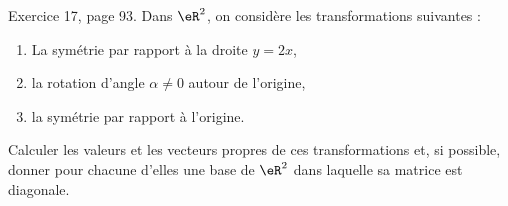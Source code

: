 \begin{exercice}\label{exoLineraire0040}

	Exercice 17, page 93. Dans $\eR^2$, on considère les transformations suivantes :
	\begin{enumerate}

		\item
			La symétrie par rapport à la droite $y=2x$,
		\item
			la rotation d'angle $\alpha\neq 0$ autour de l'origine,
		\item
			la symétrie par rapport à l'origine.
	\end{enumerate}
	Calculer les valeurs et les vecteurs propres de ces transformations et, si possible, donner pour chacune d'elles une base de $\eR^2$ dans laquelle sa matrice est diagonale.

\end{exercice}
